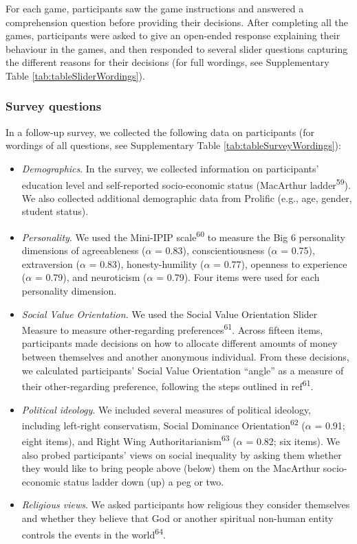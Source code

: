 \documentclass[
  english,
  man, donotrepeattitle,floatsintext]{apa6}
\providecommand{\tightlist}{%
  \setlength{\itemsep}{0pt}\setlength{\parskip}{0pt}}
\begin{document}
For each game, participants saw the game instructions and answered a
comprehension question before providing their decisions. After completing all
the games, participants were asked to give an open-ended response explaining
their behaviour in the games, and then responded to several slider questions
capturing the different reasons for their decisions (for full wordings, see
Supplementary Table \ref{tab:tableSliderWordings}).

\hypertarget{survey-questions}{%
\subsubsection{Survey questions}\label{survey-questions}}

In a follow-up survey, we collected the following data on participants (for
wordings of all questions, see Supplementary Table
\ref{tab:tableSurveyWordings}):

\begin{itemize}
\tightlist
\item
  \emph{Demographics}. In the survey, we collected information on participants'
  education level and self-reported socio-economic status (MacArthur ladder\textsuperscript{59}). We also collected additional demographic data from Prolific
  (e.g., age, gender, student status).
\item
  \emph{Personality}. We used the Mini-IPIP scale\textsuperscript{60} to measure the Big 6
  personality dimensions of agreeableness (\(\alpha\) =
  0.83), conscientiousness (\(\alpha\) =
  0.75), extraversion (\(\alpha\) =
  0.83), honesty-humility (\(\alpha\) =
  0.77), openness to experience (\(\alpha\) =
  0.79), and neuroticism (\(\alpha\) =
  0.79). Four items were used for each
  personality dimension.
\item
  \emph{Social Value Orientation}. We used the Social Value Orientation Slider
  Measure to measure other-regarding preferences\textsuperscript{61}. Across fifteen
  items, participants made decisions on how to allocate different amounts of
  money between themselves and another anonymous individual. From these
  decisions, we calculated participants' Social Value Orientation ``angle'' as a
  measure of their other-regarding preference, following the steps outlined in
  ref\textsuperscript{61}.
\item
  \emph{Political ideology}. We included several measures of political ideology,
  including left-right conservatism, Social Dominance Orientation\textsuperscript{62}
  (\(\alpha\) = 0.91; eight items), and Right
  Wing Authoritarianism\textsuperscript{63} (\(\alpha\) =
  0.82; six items). We also probed
  participants' views on social inequality by asking them whether they would
  like to bring people above (below) them on the MacArthur socio-economic status
  ladder down (up) a peg or two.
\item
  \emph{Religious views}. We asked participants how religious they consider
  themselves and whether they believe that God or another spiritual non-human
  entity controls the events in the world\textsuperscript{64}.
\end{itemize}
\end{document}
